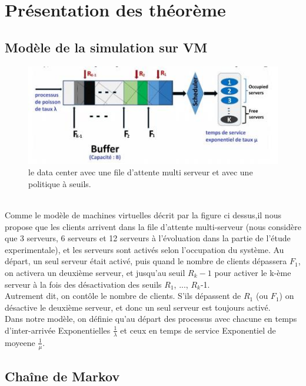 \section{Pr\'esentation des th\'eorème}



\subsection{Modèle de la simulation sur VM}
\citep{adams2012hitchhiker}
\begin{figure}[h!]
\centering
\includegraphics[width=0.70 \textwidth]{photo/modele_vm.jpg}
\caption{le data center avec une file d'attente multi serveur et avec une politique à seuils.}
\label{fig:graphe}
\end{figure}
\\
\noindent Comme le modèle de machines virtuelles décrit par la figure ci dessus,il nous propose que les clients arrivent dans la file d’attente multi-serveur (nous considère que 3 serveurs, 6 serveurs et 12 serveurs à l’évoluation dans la partie de l’étude experimentale), et les serveurs sont activés selon l’occupation du système. Au départ, un seul serveur était activé, puis quand le nombre de clients dépassera $F_{1}$, on activera un deuxième serveur, et jusqu’au seuil $R_{k}-1$ pour activer le k-ème serveur à la fois des désactivation des seuils $R_{1}$, ..., $R_{k}$-1.
\\
\noindent Autrement dit, on contôle le nombre de clients. S’ils dépassent de $R_{1}$ (ou $F_{1}$) on désactive le deuxième serveur, et donc un seul serveur est toujours activé. 
\\
\noindent Dans notre modèle, on définie qu’au départ des processus avec chacune en temps d’inter-arrivée Exponentielles $\frac{1}{\lambda}$ et ceux en temps de service Exponentiel de moyeene $\frac{1}{\mu}$.


\subsection{Chaîne de Markov}

